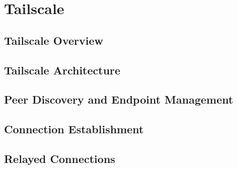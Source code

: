 \chapter{Tailscale}
\section{Tailscale Overview}

\section{Tailscale Architecture}

\section{Peer Discovery and Endpoint Management}

\section{Connection Establishment}

\section{Relayed Connections}

